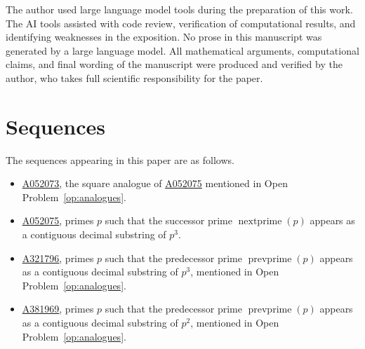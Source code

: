 \documentclass[12pt,reqno]{article}
\theoremstyle{plain}
\theoremstyle{definition}
\theoremstyle{remark}
\newcommand{\np}{\operatorname{nextprime}}
\newcommand{\prevprime}{\operatorname{prevprime}}
\newcommand{\seqnum}[1]{\href{https://oeis.org/#1}{\rm \underline{#1}}}
\begin{document}
The author used large language model tools during the preparation of
this work.
The AI tools assisted with code review, verification of computational
results, and identifying weaknesses in the exposition.
No prose in this manuscript was generated by a large language model.
All mathematical arguments, computational claims, and final wording
of the manuscript were produced and verified by the author, who takes
full scientific responsibility for the paper.

\section{Sequences}

The sequences appearing in this paper are as follows.

\begin{itemize}
\item \seqnum{A052073}, the square analogue of \seqnum{A052075}
      mentioned in Open Problem~\ref{op:analogues}.
\item \seqnum{A052075}, primes $p$ such that the successor prime
      $\np(p)$ appears as a contiguous decimal substring of $p^3$.
\item \seqnum{A321796}, primes $p$ such that the predecessor prime
      $\prevprime(p)$ appears as a contiguous decimal substring
      of $p^3$, mentioned in Open Problem~\ref{op:analogues}.
\item \seqnum{A381969}, primes $p$ such that the predecessor prime
      $\prevprime(p)$ appears as a contiguous decimal substring
      of $p^2$, mentioned in Open Problem~\ref{op:analogues}.
\end{itemize}



\end{document}

